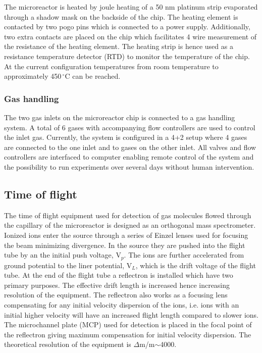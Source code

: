\documentclass[11pt]{article}
\begin{document}
The microreactor is heated by joule heating of a 50 nm platinum strip evaporated through a shadow mask on the backside of the chip. The heating element is contacted by two pogo pins which is connected to a power supply. Additionally, two extra contacts are placed on the chip which facilitates 4 wire measurement of the resistance of the heating element. The heating strip is hence used as a resistance temperature detector (RTD) to monitor the temperature of the chip. At the current configuration temperatures from room temperature to approximately 450\,$^{\circ}$C can be reached.


\subsubsection{Gas handling}
The two gas inlets on the microreactor chip is connected to a gas handling system. A total of 6 gases with accompanying flow controllers are used to control the inlet gas. Currently, the system is configured in a 4+2 setup where 4 gases are connected to the one inlet and to gases on the other inlet. All valves and flow controllers are interfaced to computer enabling remote control of the system and the possibility to run experiments over several days without human intervention.

\subsection{Time of flight}
The time of flight equipment used for detection of gas molecules flowed through the capillary of the microreactor is designed as an orthogonal mass spectrometer. Ionized ions enter the source through a series of Einzel lenses used for focusing the beam minimizing divergence. In the source they are pushed into the flight tube by an the initial push voltage, V$_p$. The ions are further accelerated from ground potential to the liner potential, V$_L$, which is the drift voltage of the flight tube. At the end of the flight tube a reflectron is installed which have two primary purposes. The effective drift length is increased hence increasing resolution of the equipment. The reflectron also works as a focusing lens compensating for any initial velocity dispersion of the ions, i.e. ions with an initial higher velocity will have an increased flight length compared to slower ions. The microchannel plate (MCP) used for detection is placed in the focal point of the reflectron giving maximum compensation for initial velocity dispersion. The theoretical resolution of the equipment is $\Delta$m/m$\sim$4000.
\end{document}
